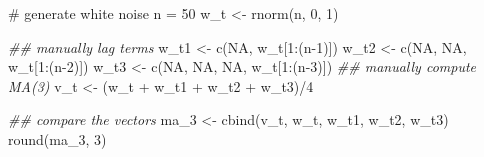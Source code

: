 \documentclass[
  letterpaper,
  DIV=11,
  numbers=noendperiod]{scrreprt}
\newenvironment{Shaded}{\begin{snugshade}}{\end{snugshade}}
\newcommand{\CommentTok}[1]{\textcolor[rgb]{0.37,0.37,0.37}{#1}}
\newcommand{\ConstantTok}[1]{\textcolor[rgb]{0.56,0.35,0.01}{#1}}
\newcommand{\DecValTok}[1]{\textcolor[rgb]{0.68,0.00,0.00}{#1}}
\newcommand{\DocumentationTok}[1]{\textcolor[rgb]{0.37,0.37,0.37}{\textit{#1}}}
\newcommand{\FunctionTok}[1]{\textcolor[rgb]{0.28,0.35,0.67}{#1}}
\newcommand{\NormalTok}[1]{\textcolor[rgb]{0.00,0.23,0.31}{#1}}
\newcommand{\OtherTok}[1]{\textcolor[rgb]{0.00,0.23,0.31}{#1}}
\newcommand{\SpecialCharTok}[1]{\textcolor[rgb]{0.37,0.37,0.37}{#1}}
\begin{document}
\begin{Shaded}
\begin{Highlighting}[]
\CommentTok{\# generate white noise}
\NormalTok{n }\OtherTok{=} \DecValTok{50}
\NormalTok{w\_t }\OtherTok{\textless{}{-}} \FunctionTok{rnorm}\NormalTok{(n, }\DecValTok{0}\NormalTok{, }\DecValTok{1}\NormalTok{)}

\DocumentationTok{\#\# manually lag terms}
\NormalTok{w\_t1 }\OtherTok{\textless{}{-}} \FunctionTok{c}\NormalTok{(}\ConstantTok{NA}\NormalTok{, w\_t[}\DecValTok{1}\SpecialCharTok{:}\NormalTok{(n}\DecValTok{{-}1}\NormalTok{)])}
\NormalTok{w\_t2 }\OtherTok{\textless{}{-}} \FunctionTok{c}\NormalTok{(}\ConstantTok{NA}\NormalTok{, }\ConstantTok{NA}\NormalTok{, w\_t[}\DecValTok{1}\SpecialCharTok{:}\NormalTok{(n}\DecValTok{{-}2}\NormalTok{)])}
\NormalTok{w\_t3 }\OtherTok{\textless{}{-}} \FunctionTok{c}\NormalTok{(}\ConstantTok{NA}\NormalTok{, }\ConstantTok{NA}\NormalTok{, }\ConstantTok{NA}\NormalTok{, w\_t[}\DecValTok{1}\SpecialCharTok{:}\NormalTok{(n}\DecValTok{{-}3}\NormalTok{)])}
\DocumentationTok{\#\# manually compute MA(3)}
\NormalTok{v\_t }\OtherTok{\textless{}{-}}\NormalTok{ (w\_t }\SpecialCharTok{+}\NormalTok{ w\_t1 }\SpecialCharTok{+}\NormalTok{ w\_t2 }\SpecialCharTok{+}\NormalTok{ w\_t3)}\SpecialCharTok{/}\DecValTok{4}

\DocumentationTok{\#\# compare the vectors}
\NormalTok{ma\_3 }\OtherTok{\textless{}{-}} \FunctionTok{cbind}\NormalTok{(v\_t, w\_t, w\_t1, w\_t2, w\_t3)}
\FunctionTok{round}\NormalTok{(ma\_3, }\DecValTok{3}\NormalTok{)}
\end{Highlighting}
\end{Shaded}
\end{document}
